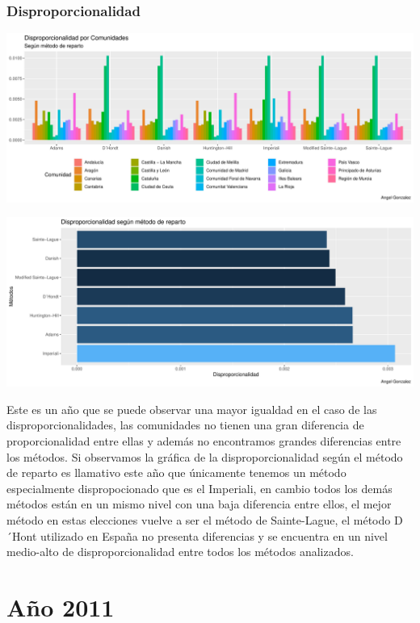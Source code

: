 \documentclass[12pt,a4paper,]{book}
\numberwithin{dummy}{section}
\theoremstyle{ocrenumbox}
\theoremstyle{blacknumex}
\theoremstyle{blacknumbox}
\theoremstyle{ocrenum}
\theoremstyle{ocrenum}
\begin{document}
\hypertarget{disproporcionalidad-8}{%
\subsubsection{Disproporcionalidad}\label{disproporcionalidad-8}}

\begin{center}\includegraphics[width=0.95\linewidth]{figurasR/unnamed-chunk-141-1} \end{center}

\begin{center}\includegraphics[width=0.95\linewidth]{figurasR/unnamed-chunk-141-2} \end{center}

Este es un año que se puede observar una mayor igualdad en el caso de
las disproporcionalidades, las comunidades no tienen una gran diferencia
de proporcionalidad entre ellas y además no encontramos grandes
diferencias entre los métodos. Si observamos la gráfica de la
disproporcionalidad según el método de reparto es llamativo este año que
únicamente tenemos un método especialmente dispropocionado que es el
Imperiali, en cambio todos los demás métodos están en un mismo nivel con
una baja diferencia entre ellos, el mejor método en estas elecciones
vuelve a ser el método de Sainte-Lague, el método D´Hont utilizado en
España no presenta diferencias y se encuentra en un nivel medio-alto de
disproporcionalidad entre todos los métodos analizados.

\hypertarget{auxf1o-2011}{%
\section{Año 2011}\label{auxf1o-2011}}
\end{document}
